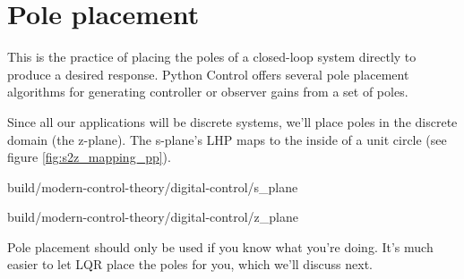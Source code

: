 \section{Pole placement}

This is the practice of placing the poles of a closed-loop \gls{system} directly
to produce a desired response. Python Control offers several pole placement
algorithms for generating controller or observer gains from a set of poles.

Since all our applications will be discrete \glspl{system}, we'll place poles in
the discrete domain (the z-plane). The s-plane's LHP maps to the inside of a
unit circle (see figure \ref{fig:s2z_mapping_pp}).
\begin{bookfigure}
  \begin{minisvg}{2}{build/modern-control-theory/digital-control/s_plane}
  \end{minisvg}
  \hfill
  \begin{minisvg}{2}{build/modern-control-theory/digital-control/z_plane}
  \end{minisvg}
  \caption{Mapping of axes from s-plane (left) to z-plane (right)}
  \label{fig:s2z_mapping_pp}
\end{bookfigure}

Pole placement should only be used if you know what you're doing. It's much
easier to let LQR place the poles for you, which we'll discuss next.
